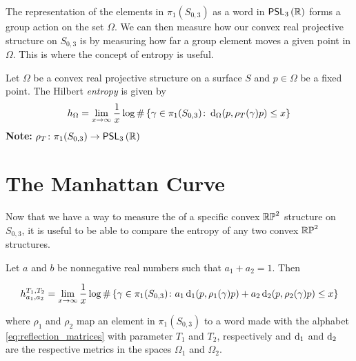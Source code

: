 \documentclass{amsart}
\begin{document}
	The representation of the elements in $\pi_1(S_{0,3})$ as a word in $\mathsf{PSL}_{3}\left(\mathbb{R}\right)$ forms a group action on the set $\Omega$. We can then measure how  our convex real projective structure on $S_{0,3}$ is by measuring how far a group element moves a given point in $\Omega$. This is where the concept of entropy is useful.
	
	\begin{definition}
		Let $\Omega$ be a convex real projective structure on a surface $S$ and $p \in \Omega$ be a fixed point. The Hilbert \emph{entropy} is given by
		\begin{equation*}
			h_\Omega = \lim_{x \to \infty} \frac{1}{x} \log \#\left\{\gamma \in \pi_1(S_{0,3}) \colon \operatorname{d}_\Omega(p,\rho_T(\gamma)p) \leq x\right\}
		\end{equation*}
		\textbf{Note:} $\rho_T \colon \pi_1(S_{0,3}) \to \mathsf{PSL}_{3}\left(\mathbb{R}\right)$	
	\end{definition}
	
	\section{The Manhattan Curve}
	
	Now that we have a way to measure the  of a specific convex $\mathbb{RP}^2$ structure on $S_{0,3}$, it is useful to be able to compare the entropy of any two convex $\mathbb{RP}^2$ structures. 
	
	Let $a$ and $b$ be nonnegative real numbers such that $a_1 + a_2 = 1$. Then
	
	\begin{equation*}
		h_{a_1,a_2}^{T_1,T_2} = \lim_{x \to \infty} \frac{1}{x} \log \#\left\{\gamma \in \pi_1(S_{0,3}) \colon a_1\operatorname{d}_1(p,\rho_1(\gamma)p) + a_2\operatorname{d}_{2}(p,\rho_2(\gamma)p) \leq x\right\}
	\end{equation*}
	
	where $\rho_1$ and $\rho_2$ map an element in $\pi_1(S_{0,3})$ to a word made with the alphabet \eqref{eq:reflection_matrices} with parameter $T_1$ and $T_2$, respectively and $\operatorname{d}_1$ and $\operatorname{d}_2$ are the respective metrics in the spaces $\Omega_1$ and $\Omega_2$.
\end{document}
